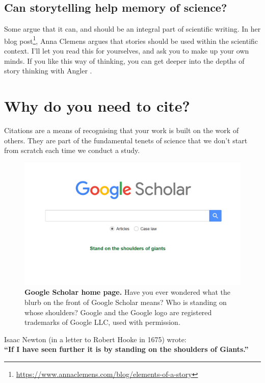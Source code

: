 \documentclass[
]{krantz}
\renewenvironment{quote}{\begin{VF}}{\end{VF}}
\renewcommand{\href}[2]{#2\footnote{\url{#1}}}
\begin{document}
\hypertarget{can-storytelling-help-memory-of-science}{%
\subsection{Can storytelling help memory of science?}\label{can-storytelling-help-memory-of-science}}

Some argue that it can, and should be an integral part of scientific writing. In her \href{https://www.annaclemens.com/blog/elements-of-a-story}{blog post}, Anna Clemens argues that stories should be used within the scientific context. I'll let you read this for yourselves, and ask you to make up your own minds. If you like this way of thinking, you can get deeper into the depths of story thinking with Angler \citeyearpar{angler2020telling}.

\hypertarget{citations}{%
\section{Why do you need to cite?}\label{citations}}

Citations are a means of recognising that your work is built on the work of others. They are part of the fundamental tenets of science that we don't start from scratch each time we conduct a study.



\begin{figure}
\includegraphics[width=0.9\linewidth]{figures/Googlescholar} \caption{\textbf{Google Scholar home page.} Have you ever wondered what the blurb on the front of Google Scholar means? Who is standing on whose shoulders? Google and the Google logo are registered trademarks of Google LLC, used with permission.}\label{fig:Googlescholar}
\end{figure}

\begin{quote}
Isaac Newton (in a letter to Robert Hooke in 1675) wrote:\\
\textbf{``If I have seen further it is by standing on the shoulders of Giants.''}
\end{quote}
\end{document}
